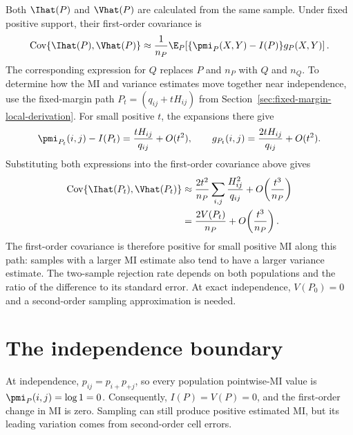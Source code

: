 Both \(\Ihat(P)\) and \(\Vhat(P)\) are calculated from the same sample. Under
fixed positive support, their first-order covariance is
\begin{equation}
  \operatorname{Cov}\{\Ihat(P),\Vhat(P)\}
  \approx \frac{1}{n_P}\E_P\!
  \left[\{\pmi_P(X,Y)-I(P)\}g_P(X,Y)\right].
\end{equation}
The corresponding expression for \(Q\) replaces \(P\) and \(n_P\) with
\(Q\) and \(n_Q\). To determine how the MI and variance estimates move
together near independence, use the fixed-margin
path \(P_t=(q_{ij}+tH_{ij})\) from
Section~\ref{sec:fixed-margin-local-derivation}. For small positive \(t\),
the expansions there give
\begin{equation}
  \pmi_{P_t}(i,j)-I(P_t)
  =\frac{tH_{ij}}{q_{ij}}+O(t^2),
  \qquad
  g_{P_t}(i,j)=\frac{2tH_{ij}}{q_{ij}}+O(t^2).
\end{equation}
Substituting both expressions into the first-order covariance above gives
\begin{align}
  \operatorname{Cov}\{\Ihat(P_t),\Vhat(P_t)\}
  &\approx \frac{2t^2}{n_P}
      \sum_{i,j}\frac{H_{ij}^2}{q_{ij}}
      +O\!\left(\frac{t^3}{n_P}\right)\\
  &=\frac{2V(P_t)}{n_P}
      +O\!\left(\frac{t^3}{n_P}\right).
\end{align}
The first-order covariance is therefore positive for small positive MI
along this path: samples with a larger MI estimate also tend to have a
larger variance estimate. The two-sample rejection rate depends on both
populations and the ratio of the difference to its standard error.
At exact independence, \(V(P_0)=0\) and a second-order sampling
approximation is needed.

\section{The independence boundary}
\label{sec:independence-boundary}

At independence, \(p_{ij}=p_{i+}p_{+j}\), so every population
pointwise-MI value is \(\pmi_P(i,j)=\log 1=0\). Consequently,
\(I(P)=V(P)=0\), and the first-order change in MI is zero. Sampling can
still produce positive estimated MI, but its leading variation comes from
second-order cell errors.

